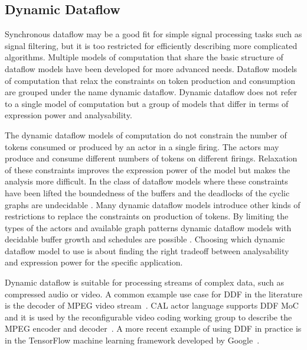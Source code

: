 \FloatBarrier
\subsection{Dynamic Dataflow}
\label{subsec:dynamic-dataflow}
Synchronous dataflow may be a good fit for simple signal processing tasks such as signal filtering, but it is too restricted for efficiently describing more complicated algorithms. Multiple models of computation that share the basic structure of dataflow models have been developed for more advanced needs. Dataflow models of computation that relax the constraints on token production and consumption are grouped under the name dynamic dataflow. Dynamic dataflow does not refer to a single model of computation but a group of models that differ in terms of expression power and analysability.~\cite{bhattacharyya2013handbook}

The dynamic dataflow models of computation do not constrain the number of tokens consumed or produced by an actor in a single firing. The actors may produce and consume different numbers of tokens on different firings. Relaxation of these constraints improves the expression power of the model but makes the analysis more difficult. In the class of dataflow models where these constraints have been lifted the boundedness of the buffers and the deadlocks of the cyclic graphs are undecidable \cite{buck1993scheduling}. Many dynamic dataflow models introduce other kinds of restrictions to replace the constraints on production of tokens. By limiting the types of the actors and available graph patterns dynamic dataflow models with decidable buffer growth and schedules are possible \cite{bhattacharyya2013handbook, gao1992well}. Choosing which dynamic dataflow model to use is about finding the right tradeoff between analysability and expression power for the specific application.

Dynamic dataflow is suitable for processing streams of complex data, such as compressed audio or video. A common example use case for DDF in the literature is the decoder of MPEG video stream~\cite{bhattacharyya2013handbook}. CAL actor language supports DDF MoC and it is used by the reconfigurable video coding working group to describe the MPEG encoder and decoder~\cite{bhattacharyya2011overview}. A more recent example of using DDF in practice is in the TensorFlow machine learning framework developed by Google~\cite{tensorflow2015-whitepaper}.
